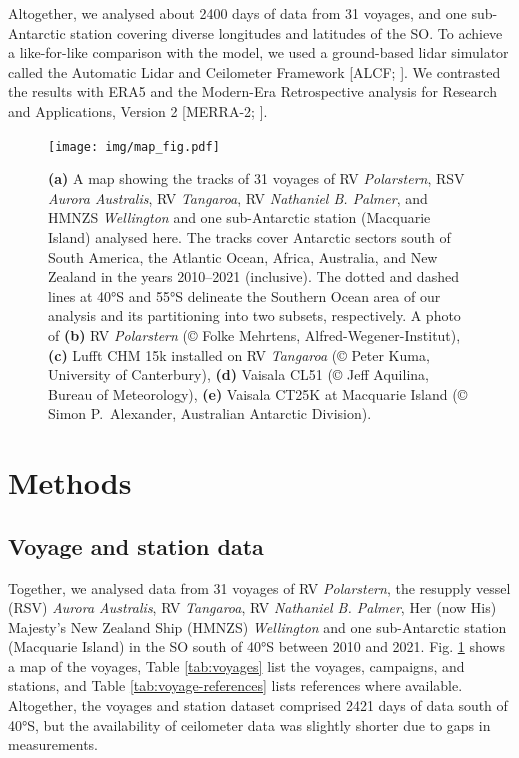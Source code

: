 \documentclass[draft]{agujournal2019}
\begin{document}
Altogether, we analysed about 2400 days of data from 31 voyages, and one
sub-Antarctic station covering diverse longitudes and latitudes of the SO. To
achieve a like-for-like comparison with the model, we used a ground-based lidar
simulator called the Automatic Lidar and Ceilometer Framework [ALCF;
]. We contrasted the results with ERA5  and the
Modern-Era Retrospective analysis for Research and Applications, Version 2
[MERRA-2; ].

\begin{figure}[b!]
\centering
\texttt{[image: img/map\_fig.pdf]}
\caption{
\textbf{(a)} A map showing the tracks of 31 voyages of RV \emph{Polarstern},
RSV \emph{Aurora Australis}, RV \emph{Tangaroa}, RV \emph{Nathaniel B. Palmer},
and HMNZS \emph{Wellington} and one sub-Antarctic station (Macquarie Island)
analysed here. The tracks cover Antarctic sectors south of South America, the
Atlantic Ocean, Africa, Australia, and New Zealand in the years 2010--2021
(inclusive).  The dotted and dashed lines at 40°S and 55°S delineate the
Southern Ocean area of our analysis and its partitioning into two subsets,
respectively.  A photo of \textbf{(b)} RV \emph{Polarstern} (© Folke Mehrtens,
Alfred-Wegener-Institut), \textbf{(c)} Lufft CHM 15k installed on RV
\emph{Tangaroa} (© Peter Kuma, University of Canterbury), \textbf{(d)} Vaisala
CL51 (© Jeff Aquilina, Bureau of Meteorology), \textbf{(e)} Vaisala CT25K at
Macquarie Island (© Simon P.\ Alexander, Australian Antarctic Division).
}
\label{fig:map}
\end{figure}

\section{Methods}
\label{sec:methods}

\subsection{Voyage and station data}

Together, we analysed data from 31 voyages of RV \emph{Polarstern}, the
resupply vessel (RSV) \emph{Aurora Australis}, RV \emph{Tangaroa}, RV
\emph{Nathaniel B.  Palmer}, Her (now His) Majesty's New Zealand Ship (HMNZS)
\emph{Wellington} and one sub-Antarctic station (Macquarie Island) in the SO
south of 40°S between 2010 and 2021. Fig. \ref{fig:map} shows a map of the
voyages, Table \ref{tab:voyages} list the voyages, campaigns, and stations, and
Table \ref{tab:voyage-references} lists references where available. Altogether,
the voyages and station dataset comprised 2421 days of data south of 40°S, but
the availability of ceilometer data was slightly shorter due to gaps in
measurements.
\end{document}
